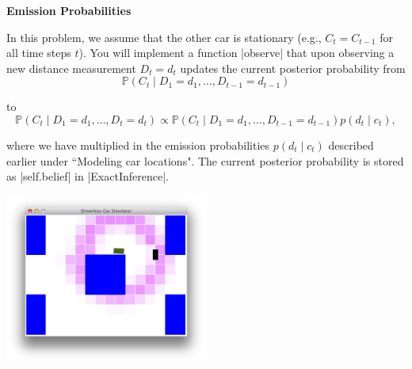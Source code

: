 \item {\bf Emission Probabilities}

In this problem, we assume that the other car is stationary (e.g., $C_t =
C_{t-1}$ for all time steps $t$). You will implement a function |observe| that
upon observing a new distance measurement $D_t = d_t$ updates the current
posterior probability from
\[\mathbb P(C_t \mid D_1 = d_1, \dots, D_{t-1} = d_{t-1})\]

to
\[\mathbb P(C_t \mid D_1 = d_1, \dots, D_t = d_t) \propto \mathbb P(C_t \mid D_1
= d_1, \dots, D_{t-1} = d_{t-1}) p(d_t \mid c_t),\]

where we have multiplied in the emission probabilities $p(d_t \mid c_t)$
described earlier under ``Modeling car locations". The current posterior
probability is stored as |self.belief| in |ExactInference|.

\begin{center}
\includegraphics[width=0.5\textwidth]{media/emission.png}
\end{center}

\begin{enumerate}

  

\end{enumerate}
